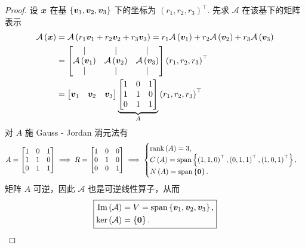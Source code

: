 \begin{proof}
设 $\boldsymbol{x}$ 在基 $\left\{\boldsymbol{v}_1, \boldsymbol{v}_2, \boldsymbol{v}_3\right\}$ 下的坐标为 $\left(r_1, r_2, r_3\right)^\top$. 先求 $\mathcal{A}$ 在该基下的矩阵表示
\[
\begin{aligned}
    \mathcal{A} \left(\boldsymbol{x}\right) &= \mathcal{A} \left(r_1 \boldsymbol{v}_1 + r_2 \boldsymbol{v}_2 + r_3 \boldsymbol{v}_3\right) = r_1 \mathcal{A} \left(\boldsymbol{v}_1\right) + r_2 \mathcal{A} \left(\boldsymbol{v}_2\right) + r_3 \mathcal{A} \left(\boldsymbol{v}_3\right) \\
    &= \begin{bmatrix}
        | & | & | \\
        \mathcal{A} \left(\boldsymbol{v}_1\right) & \mathcal{A} \left(\boldsymbol{v}_2\right) & \mathcal{A} \left(\boldsymbol{v}_3\right) \\
        | & | & | \\
    \end{bmatrix} \left(r_1, r_2, r_3\right)^\top \\
    &= \begin{bmatrix}\boldsymbol{v}_1 & \boldsymbol{v}_2 & \boldsymbol{v}_3\end{bmatrix} \underbrace{\begin{bmatrix}
        1 & 0 & 1 \\
        1 & 1 & 0 \\
        0 & 1 & 1 \\
    \end{bmatrix}}_{A} \left(r_1, r_2, r_3\right)^\top
\end{aligned}
\]
对 $A$ 施 Gauss - Jordan 消元法有
\[
A = \begin{bmatrix}
        1 & 0 & 1 \\
        1 & 1 & 0 \\
        0 & 1 & 1 \\
    \end{bmatrix}
\implies
R = \begin{bmatrix}
    1 & 0 & 0 \\
    0 & 1 & 0 \\
    0 & 0 & 1 \\
\end{bmatrix}
\implies
\begin{cases}
    \mathrm{rank} \left(A\right) = 3, \\
    C \left(A\right) = \mathrm{span} \left\{\left(1, 1, 0\right)^\top, \left(0, 1, 1\right)^\top, \left(1, 0, 1\right)^\top\right\}, \\
    N \left(A\right) = \mathrm{span} \left\{\boldsymbol{0}\right\}. \\
\end{cases}
\]
矩阵 $A$ 可逆，因此 $\mathcal A$ 也是可逆线性算子，从而
\[
\boxed{
    \begin{aligned}
        \mathrm{Im} \left(\mathcal{A}\right) &= V = \mathrm{span} \left\{\boldsymbol{v}_1,\boldsymbol{v}_2,\boldsymbol{v}_3\right\}, \\
        \ker \left(\mathcal{A}\right) &= \left\{\boldsymbol{0}\right\}. \\
    \end{aligned}
}
\]

\end{proof}
